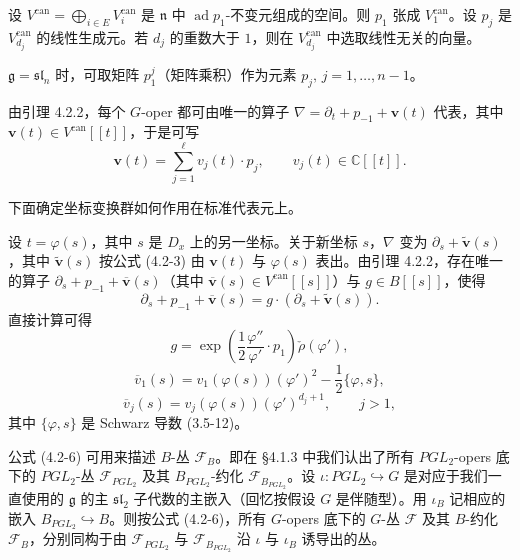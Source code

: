 设 $V^{\mathrm{can}}=\bigoplus_{i\in E}V_i^{\mathrm{can}}$ 是 $\mathfrak{n}$ 中 $\operatorname{ad}p_1$-不变元组成的空间。则 $p_1$ 张成 $V_1^{\mathrm{can}}$。设 $p_j$ 是 $V_{d_j}^{\mathrm{can}}$ 的线性生成元。若 $d_j$ 的重数大于 $1$，则在 $V_{d_j}^{\mathrm{can}}$ 中选取线性无关的向量。

$\mathfrak{g}=\mathfrak{sl}_n$ 时，可取矩阵 $p_1^j$（矩阵乘积）作为元素 $p_j,\,j=1,\dots,n-1$。

由引理 4.2.2，每个 $G$-oper 都可由唯一的算子 $\nabla=\partial_t+p_{-1}+\mathbf{v}(t)$ 代表，其中 $\mathbf{v}(t)\in V^{\mathrm{can}}[[t]]$，于是可写
\[
    \mathbf{v}(t)=\sum_{j=1}^{\ell}v_j(t)\cdot p_j,\qquad v_j(t)\in\mathbb{C}[[t]].
\]

下面确定坐标变换群如何作用在标准代表元上。

设 $t=\varphi(s)$，其中 $s$ 是 $D_x$ 上的另一坐标。关于新坐标 $s$，$\nabla$ 变为 $\partial_s+\widetilde{\mathbf{v}}(s)$，其中 $\widetilde{\mathbf{v}}(s)$ 按公式 (4.2-3) 由 $\mathbf{v}(t)$ 与 $\varphi(s)$ 表出。由引理 4.2.2，存在唯一的算子 $\partial_s+p_{-1}+\overline{\mathbf{v}}(s)$（其中 $\overline{\mathbf{v}}(s)\in V^{\mathrm{can}}[[s]]$）与 $g\in B[[s]]$，使得
\begin{equation}
    \partial_s+p_{-1}+\overline{\mathbf{v}}(s)=g\cdot\left(\partial_s+\widetilde{\mathbf{v}}(s)\right).
    \tag{4.2-5}
\end{equation}
直接计算可得
\begin{equation}
    g=\exp\left(\frac{1}{2}\frac{\varphi''}{\varphi'}\cdot p_1\right)\check{\rho}(\varphi'),
    \tag{4.2-6}
\end{equation}
\begin{equation}
    \overline{v}_1(s)=v_1(\varphi(s))(\varphi')^2-\frac{1}{2}\{\varphi,s\},
    \tag{4.2-7}
\end{equation}
\begin{equation}
    \overline{v}_j(s)=v_j(\varphi(s))(\varphi')^{d_j+1},\qquad j>1,
    \tag{4.2-8}
\end{equation}
其中 $\{\varphi,s\}$ 是 Schwarz 导数 (3.5-12)。


公式 (4.2-6) 可用来描述 $B$-丛 $\mathcal{F}_B$。即在 §4.1.3 中我们认出了所有 $PGL_2$-opers 底下的 $PGL_2$-丛 $\mathcal{F}_{PGL_2}$ 及其 $B_{PGL_2}$-约化 $\mathcal{F}_{B_{PGL_2}}$。设 $\iota:PGL_2\hookrightarrow G$ 是对应于我们一直使用的 $\mathfrak{g}$ 的主 $\mathfrak{sl}_2$ 子代数的主嵌入（回忆按假设 $G$ 是伴随型）。用 $\iota_B$ 记相应的嵌入 $B_{PGL_2}\hookrightarrow B$。则按公式 (4.2-6)，所有 $G$-opers 底下的 $G$-丛 $\mathcal{F}$ 及其 $B$-约化 $\mathcal{F}_B$，分别同构于由 $\mathcal{F}_{PGL_2}$ 与 $\mathcal{F}_{B_{PGL_2}}$ 沿 $\iota$ 与 $\iota_B$ 诱导出的丛。

